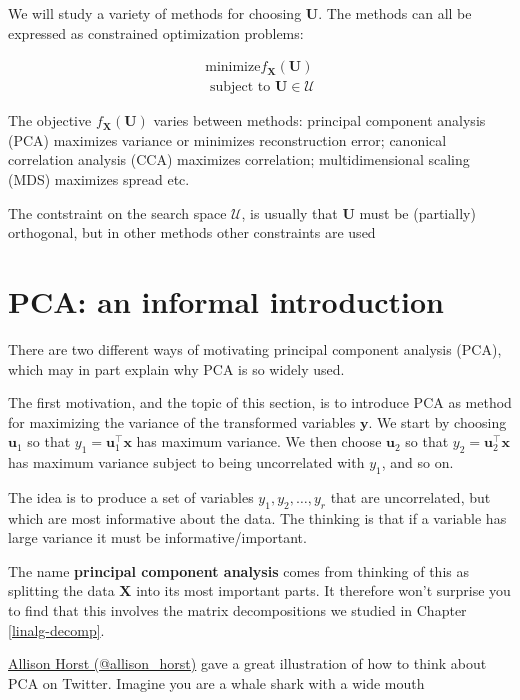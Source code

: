 \documentclass[]{book}
\theoremstyle{definition}
\theoremstyle{definition}
\theoremstyle{definition}
\theoremstyle{remark}
\begin{document}
We will study a variety of methods for choosing \(\boldsymbol U\). The methods can all be expressed as constrained optimization problems:

\begin{align}
\mbox{minimize} f_{\boldsymbol X}(\boldsymbol U) \label{eq:dimredopt} \\
\mbox{ subject to } \boldsymbol U\in \mathcal{U} 
\end{align}

The objective \(f_{\boldsymbol X}(\boldsymbol U)\) varies between methods: principal component analysis (PCA) maximizes variance or minimizes reconstruction error; canonical correlation analysis (CCA) maximizes correlation; multidimensional scaling (MDS) maximizes spread etc.

The contstraint on the search space \(\mathcal{U}\), is usually that \(\boldsymbol U\) must be (partially) orthogonal, but in other methods other constraints are used

\hypertarget{pca-an-informal-introduction}{%
\section{PCA: an informal introduction}\label{pca-an-informal-introduction}}

There are two different ways of motivating
principal component analysis (PCA), which may in part explain why PCA is so widely used.

The first motivation, and the topic of this section, is to introduce PCA as method for maximizing the variance of the transformed variables \(\boldsymbol y\). We start by choosing \(\boldsymbol u_1\) so that \(y_1=\boldsymbol u_1^\top \boldsymbol x\) has maximum variance. We then choose \(\boldsymbol u_2\) so that \(y_2=\boldsymbol u_2^\top \boldsymbol x\) has maximum variance subject to being uncorrelated with \(y_1\), and so on.

The idea is to produce a set of variables \(y_1, y_2, \ldots, y_r\) that are uncorrelated, but which are most informative about the data. The thinking is that if a variable has large variance it must be informative/important.

The name \textbf{principal component analysis} comes from thinking of this as splitting the data \(\boldsymbol X\) into its most important parts. It therefore won't surprise you to find that this involves the matrix decompositions we studied in Chapter \ref{linalg-decomp}.

\href{https://twitter.com/allison_horst/status/1288904459490213888?lang=en}{Allison Horst (@allison\_horst)} gave a great illustration of how to think about PCA on Twitter. Imagine you are a whale shark with a wide mouth
\end{document}
